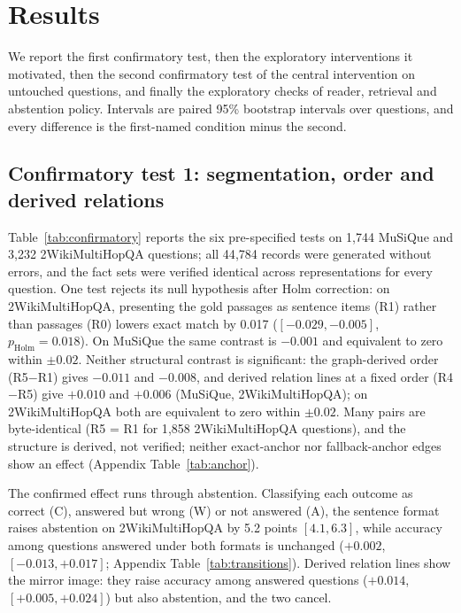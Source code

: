 \section{Results}
\label{sec:results}

We report the first confirmatory test, then the exploratory interventions it motivated, then the second confirmatory test of the central intervention on untouched questions, and finally the exploratory checks of reader, retrieval and abstention policy. Intervals are paired 95\% bootstrap intervals over questions, and every difference is the first-named condition minus the second.

\subsection{Confirmatory test 1: segmentation, order and derived relations}

Table~\ref{tab:confirmatory} reports the six pre-specified tests on 1{,}744 MuSiQue and 3{,}232 2WikiMultiHopQA questions; all 44{,}784 records were generated without errors, and the fact sets were verified identical across representations for every question. One test rejects its null hypothesis after Holm correction: on 2WikiMultiHopQA, presenting the gold passages as sentence items (R1) rather than passages (R0) lowers exact match by 0.017 ($[-0.029, -0.005]$, $p_{\text{Holm}}=0.018$). On MuSiQue the same contrast is $-0.001$ and equivalent to zero within $\pm0.02$. Neither structural contrast is significant: the graph-derived order (R5$-$R1) gives $-0.011$ and $-0.008$, and derived relation lines at a fixed order (R4$-$R5) give $+0.010$ and $+0.006$ (MuSiQue, 2WikiMultiHopQA); on 2WikiMultiHopQA both are equivalent to zero within $\pm0.02$. Many pairs are byte-identical (R5 = R1 for 1{,}858 2WikiMultiHopQA questions), and the structure is derived, not verified; neither exact-anchor nor fallback-anchor edges show an effect (Appendix Table~\ref{tab:anchor}).



The confirmed effect runs through abstention. Classifying each outcome as correct (C), answered but wrong (W) or not answered (A), the sentence format raises abstention on 2WikiMultiHopQA by 5.2 points $[4.1, 6.3]$, while accuracy among questions answered under both formats is unchanged ($+0.002$, $[-0.013, +0.017]$; Appendix Table~\ref{tab:transitions}). Derived relation lines show the mirror image: they raise accuracy among answered questions ($+0.014$, $[+0.005, +0.024]$) but also abstention, and the two cancel.

